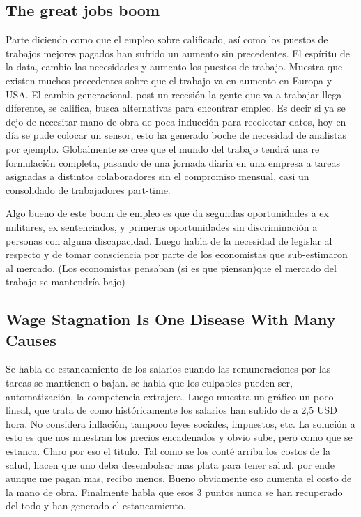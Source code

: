 \subsection{The great jobs boom} 
Parte diciendo como que el empleo sobre calificado, así como los puestos de trabajos mejores pagados han sufrido un aumento sin precedentes. El espíritu de la data, cambio las necesidades y aumento los puestos de trabajo. Muestra que existen muchos precedentes sobre que el trabajo va en aumento en Europa y USA. El cambio generacional, post un recesión la gente que va a trabajar llega diferente, se califica, busca alternativas para encontrar empleo.  Es decir si ya se dejo de necesitar mano de obra de poca inducción para recolectar datos, hoy en día se pude colocar un sensor, esto ha generado boche de necesidad de analistas por ejemplo. 
Globalmente se cree que el mundo del trabajo tendrá una re formulación completa, pasando de una jornada diaria en una empresa a tareas asignadas a distintos colaboradores sin el compromiso mensual, casi un consolidado de trabajadores part-time. 

Algo bueno de este boom de empleo es que da segundas oportunidades a ex militares, ex sentenciados, y primeras oportunidades sin discriminación a personas con alguna discapacidad. 
Luego habla de la necesidad de legislar al respecto y de tomar consciencia por parte de los economistas que sub-estimaron al mercado. (Los economistas pensaban (si es que piensan)que el mercado del trabajo se mantendría bajo)
\subsection{Wage Stagnation Is One Disease With Many Causes} Se habla de estancamiento de los salarios cuando las remuneraciones por las tareas se mantienen o bajan.
se habla que los culpables pueden ser, automatización, la competencia extrajera. 
\smallskip
Luego muestra un gráfico un poco lineal, que trata de como históricamente los salarios han subido de a 2,5 USD hora. No considera inflación, tampoco leyes sociales, impuestos, etc. La solución a esto es que nos muestran los precios encadenados y obvio sube, pero como que se estanca. Claro por eso el titulo. 
\smallskip
Tal como se los conté arriba los costos de la salud, hacen que uno deba desembolsar mas plata para tener salud. por ende aunque me pagan mas, recibo menos. Bueno obviamente eso aumenta el costo de la mano de obra.  Finalmente habla que esos 3 puntos nunca se han recuperado del todo y han generado el estancamiento. 